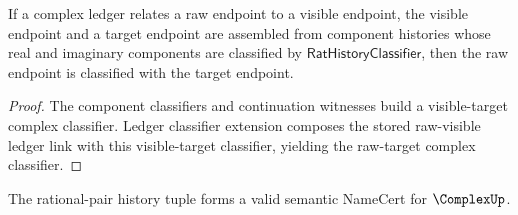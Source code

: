 \begin{theorem}
\label{thm:complex-ledger-component-classifier-extension}
If a complex ledger relates a raw endpoint to a visible endpoint, the visible
endpoint and a target endpoint are assembled from component histories whose
real and imaginary components are classified by $\mathsf{RatHistoryClassifier}$,
then the raw endpoint is classified with the target endpoint.
\end{theorem}
\begin{proof}
The component classifiers and continuation witnesses build a visible-target
complex classifier. Ledger classifier extension composes the stored
raw-visible ledger link with this visible-target classifier, yielding the
raw-target complex classifier.
\end{proof}

\begin{theorem}
\label{thm:concrete-complex-namecert}
The rational-pair history tuple forms a valid semantic NameCert for \(\ComplexUp\).
\end{theorem}

